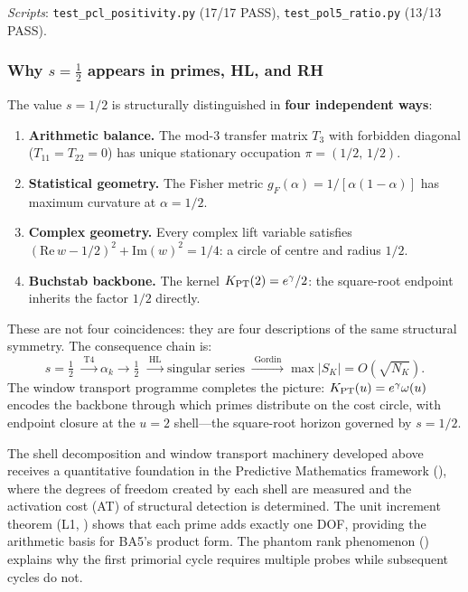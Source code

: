\documentclass[12pt,a4paper]{article}
\begin{document}
\noindent
\textit{Scripts}:
\texttt{test\_pcl\_positivity.py} (17/17 PASS),
\texttt{test\_pol5\_ratio.py} (13/13 PASS).

\subsubsection{Why $s = \tfrac{1}{2}$ appears in primes, HL, and RH}
\label{sec:ch9_s_half}

The value $s = 1/2$ is structurally distinguished in
\textbf{four independent ways}:
\begin{enumerate}[nosep]
\item \textbf{Arithmetic balance.}  The mod-3 transfer matrix
  $T_3$ with forbidden diagonal ($T_{11} = T_{22} = 0$) has
  unique stationary occupation $\pi = (1/2,\,1/2)$.
\item \textbf{Statistical geometry.}  The Fisher metric
  $g_F(\alpha) = 1/[\alpha(1-\alpha)]$ has maximum curvature at
  $\alpha = 1/2$.
\item \textbf{Complex geometry.}  Every complex lift variable satisfies
  $(\mathrm{Re}\,w - 1/2)^2 + \mathrm{Im}(w)^2 = 1/4$: a circle
  of centre and radius $1/2$.
\item \textbf{Buchstab backbone.}  The kernel
  $K_{\rm PT}(2) = e^\gamma/2$: the square-root endpoint
  inherits the factor $1/2$ directly.
\end{enumerate}

These are not four coincidences: they are four descriptions of
the same structural symmetry.  The consequence chain is:
\begin{equation}
  s = \tfrac{1}{2}
  \;\xrightarrow{\;\text{T4}\;}
  \alpha_k \to \tfrac{1}{2}
  \;\xrightarrow{\;\text{HL}\;}
  \text{singular series}
  \;\xrightarrow{\;\text{Gordin}\;}
  \max|S_K| = O(\sqrt{N_K}).
  \label{eq:s_half_chain}
\end{equation}
The window transport programme completes the picture:
$K_{\rm PT}(u) = e^\gamma\omega(u)$ encodes the backbone through
which primes distribute on the cost circle, with endpoint closure
at the $u = 2$ shell---the square-root horizon governed by $s = 1/2$.

\begin{remark}\mBR
\label{rem:PM_bridge}
The shell decomposition and window transport machinery developed above
receives a quantitative foundation in the Predictive Mathematics
framework (\cite{companion_M4}), where the degrees of freedom
created by each shell are measured and the activation cost (AT) of
structural detection is determined.  The unit increment theorem
(L1, \cite{companion_M4}) shows that each prime adds exactly one DOF,
providing the arithmetic basis for BA5's product form.  The phantom
rank phenomenon (\cite{companion_M4}) explains why the first primorial
cycle requires multiple probes while subsequent cycles do not.
\end{remark}
\end{document}
